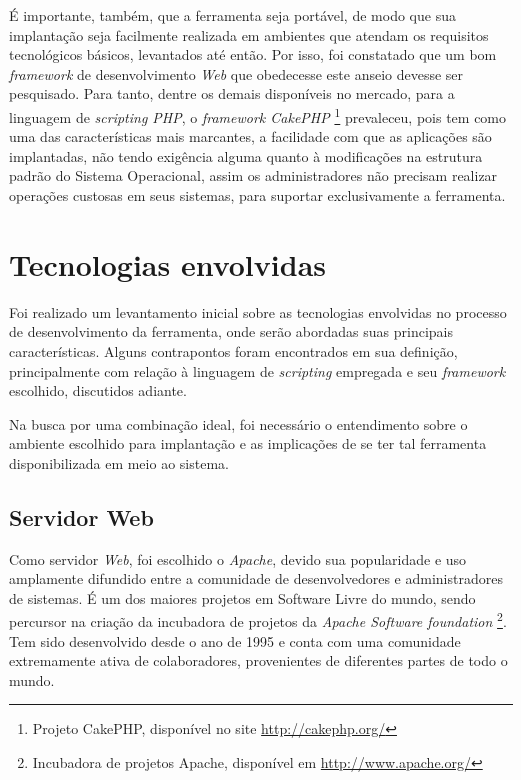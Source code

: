 É importante, também, que a ferramenta seja portável, de modo que sua implantação seja facilmente realizada em ambientes que atendam os requisitos tecnológicos básicos, levantados até então. Por isso, foi constatado que um bom \textit{framework} de desenvolvimento \textit{Web} que obedecesse este anseio devesse ser pesquisado. Para tanto, dentre os demais disponíveis no mercado, para a linguagem de \textit{scripting PHP}, o \textit{framework CakePHP} \footnote{Projeto CakePHP, disponível no site \url{http://cakephp.org/}} prevaleceu, pois tem como uma das características mais marcantes, a facilidade com que as aplicações são implantadas, não tendo exigência alguma quanto à modificações na estrutura padrão do Sistema Operacional, assim os administradores não precisam realizar operações custosas em seus sistemas, para suportar exclusivamente a ferramenta.


\section{Tecnologias envolvidas}

Foi realizado um levantamento inicial sobre as tecnologias envolvidas no processo de desenvolvimento da ferramenta, onde serão abordadas suas principais características. Alguns contrapontos foram encontrados em sua definição, principalmente com relação à linguagem de \textit{scripting} empregada e seu \textit{framework} escolhido, discutidos adiante.

Na busca por uma combinação ideal, foi necessário o entendimento sobre o ambiente escolhido para implantação e as implicações de se ter tal ferramenta disponibilizada em meio ao sistema.

\subsection{Servidor Web}

Como servidor \textit{Web}, foi escolhido o \textit{Apache}, devido sua popularidade e uso amplamente difundido entre a comunidade de desenvolvedores e administradores de sistemas. É um dos maiores projetos em Software Livre do mundo, sendo percursor na criação da incubadora de projetos da \textit{Apache Software foundation} \footnote{Incubadora de projetos Apache, disponível em \url{http://www.apache.org/}}. Tem sido desenvolvido desde o ano de 1995 e conta com uma comunidade extremamente ativa de colaboradores, provenientes de diferentes partes de todo o mundo.

